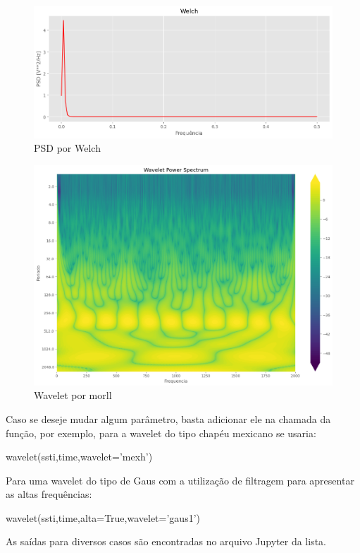\documentclass[12pt,a4paper,portuguese]{article}
\begin{document}
\begin{figure}[H]
	\centering
	\includegraphics[width=1\linewidth]{lista6-1}
	\caption{PSD por Welch}
	\label{fig:lista6-1}
\end{figure}

\begin{figure}[H]
	\centering
	\includegraphics[width=1\linewidth]{lista6-2}
	\caption{Wavelet por morll}
	\label{fig:lista6-2}
\end{figure}

Caso se deseje mudar algum parâmetro, basta adicionar ele na chamada da função, por exemplo, para a wavelet do tipo chapéu mexicano se usaria:
\begin{python}
wavelet(ssti,time,wavelet='mexh')
\end{python}
Para uma wavelet do tipo de Gaus com a utilização de filtragem para apresentar as altas frequências:
\begin{python}
wavelet(ssti,time,alta=True,wavelet='gaus1')
\end{python}
As saídas para diversos casos são encontradas no arquivo Jupyter da lista.
\end{document}
